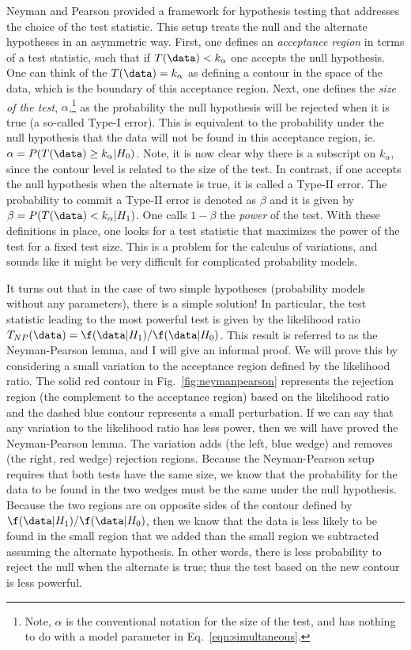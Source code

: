 Neyman and Pearson provided a framework for hypothesis testing that addresses the choice of the test statistic.  This setup treats the null and the alternate hypotheses in an asymmetric way.  First, one defines an \textit{acceptance region} in terms of a test statistic, such that if $T(\data)< k_\alpha$ one accepts the null hypothesis.  One can think of the $T(\data) = k_\alpha$ as defining a contour in the space of the data, which is the boundary of this acceptance region.  Next, one defines the \textit{size of the test}, $\alpha$,\footnote{Note, $\alpha$ is the conventional notation for the size of the test, and has nothing to do with a model parameter in Eq.~\ref{eqn:simultaneous}.} as the probability the null hypothesis will be rejected when it is true (a so-called Type-I error).  This is equivalent to the probability under the null hypothesis that the data will not be found in this acceptance region, ie. $\alpha = P(T(\data) \ge k_\alpha | H_0)$.  Note, it is now clear why there is a subscript on $k_\alpha$, since the contour level is related to the size of the test.  In contrast, if one accepts the null hypothesis when the alternate is true, it is called a Type-II error.  The probability to commit a Type-II error is denoted as $\beta$ and it is given by $\beta=P(T(\data) < k_\alpha|H_1)$.  One calls $1-\beta$ the \textit{power} of the test.  With these definitions in place, one looks for a test statistic that maximizes the power of the test for a fixed test size.  This is a problem for the calculus of variations, and sounds like it might be very difficult for complicated probability models. 


It turns out that in the case of two simple hypotheses (probability models without any parameters), there is a simple solution!  In particular, the test statistic leading to the most powerful test is given by the likelihood ratio $T_{NP}(\data) = \f(\data|H_1)/\f(\data|H_0)$.  This result is referred to as the Neyman-Pearson lemma, and I will give an informal proof.  We will prove this by considering a small variation to the acceptance region defined by the likelihood ratio.  The solid red contour in Fig.~\ref{fig:neymanpearson} represents the rejection region (the complement to the acceptance region) based on the likelihood ratio and the dashed blue contour represents a small perturbation.  If we can say that any variation to the likelihood ratio has less power, then we will have proved the Neyman-Pearson lemma.  The variation adds (the left, blue wedge) and removes (the right, red wedge) rejection regions.  Because the Neyman-Pearson setup requires that both tests have the same size, we know that the probability for the data to be found in the two wedges must be the same under the null hypothesis.  Because the two regions are on opposite sides of the contour defined by $ \f(\data|H_1)/\f(\data|H_0)$, then we know that the data is less likely to be found in the small region that we added than the small region we subtracted assuming the alternate hypothesis.  In other words, there is less probability to reject the null when the alternate is true; thus the  test based on the new contour is less powerful.
